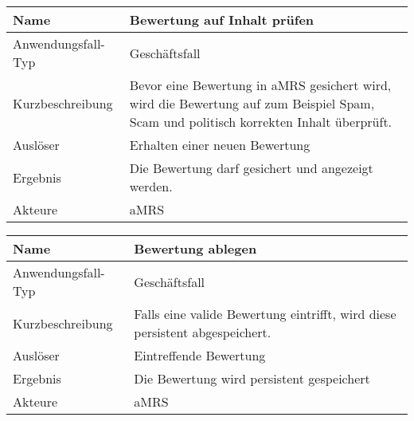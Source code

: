 \begin{table}[H]
    \centering
    \label{bewertungPruefen}
    \begin{tabularx}{\textwidth}{| l | X |}
        \hline
        Name               & Bewertung auf Inhalt prüfen                                                                                                                \\
        \hline
        Anwendungsfall-Typ & Geschäftsfall                                                                                                                              \\
        \hline
        Kurzbeschreibung   & Bevor eine Bewertung in \ac{aMRS} gesichert wird, wird die Bewertung auf zum Beispiel Spam, Scam und politisch korrekten Inhalt überprüft. \\
        \hline
        Auslöser           & Erhalten einer neuen Bewertung                                                                                                             \\
        \hline
        Ergebnis           & Die Bewertung darf gesichert und angezeigt werden.                                                                                         \\
        \hline
        Akteure            & \ac{aMRS}                                                                                                                                  \\
        \hline
    \end{tabularx}
\end{table}


\begin{table}[H]
    \centering
    \label{bewertungablegen}
    \begin{tabularx}{\textwidth}{| l | X |}
        \hline
        Name               & Bewertung ablegen                                                           \\
        \hline
        Anwendungsfall-Typ & Geschäftsfall                                                               \\
        \hline
        Kurzbeschreibung   & Falls eine valide Bewertung eintrifft, wird diese persistent abgespeichert. \\
        \hline
        Auslöser           & Eintreffende Bewertung                                                      \\
        \hline
        Ergebnis           & Die Bewertung wird persistent gespeichert                                   \\
        \hline
        Akteure            & \ac{aMRS}                                                                   \\
        \hline
    \end{tabularx}
\end{table}

